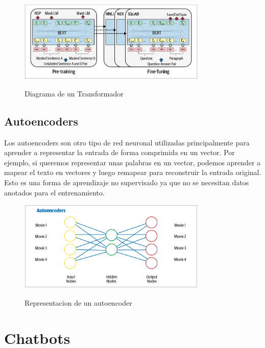 \begin{figure}[H]
    \centering
    \includegraphics[width=0.8\textwidth]{imagenes/Cap 2/tranformers.png}
    \caption{Diagrama de un Transformador}
    \label{fig:RNN}
    \cite{sowmya_practical_npl}
\end{figure}

\subsection{Autoencoders}
Los autoencoders son otro tipo de red neuronal utilizadas principalmente para aprender a representar la
entrada de forma comprimida en un vector. Por ejemplo, si queremos representar unas palabras en un vector, 
podemos aprender a mapear el texto en vectores y luego remapear para reconstruir la entrada original.
Esto es una forma de aprendizaje no supervisado ya que no se necesitan datos anotados para el entrenamiento.\\

\begin{figure}[H]
    \centering
    \includegraphics[width=0.8\textwidth]{imagenes/Cap 2/autoencoder.png}
    \caption{Representacion de un autoencoder}
    \label{fig:autoencoder}
    \cite{sowmya_practical_npl}
\end{figure}




\section{Chatbots}


